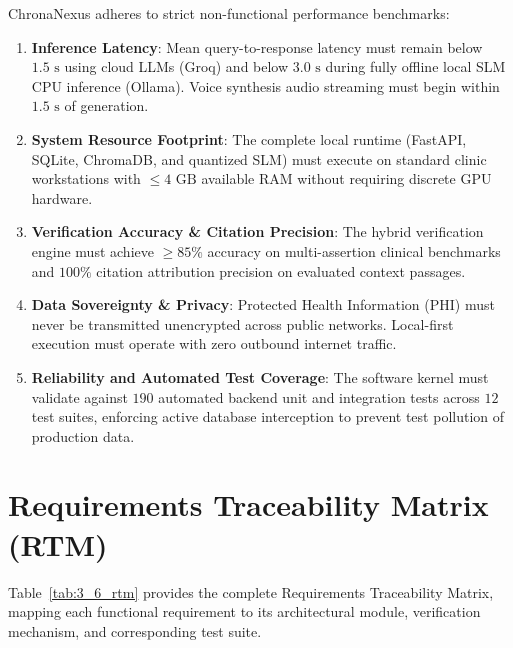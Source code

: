 ChronaNexus adheres to strict non-functional performance benchmarks:
\begin{enumerate}
    \item \textbf{Inference Latency}: Mean query-to-response latency must remain below $1.5\text{ s}$ using cloud LLMs (Groq) and below $3.0\text{ s}$ during fully offline local SLM CPU inference (Ollama). Voice synthesis audio streaming must begin within $1.5\text{ s}$ of generation.
    \item \textbf{System Resource Footprint}: The complete local runtime (FastAPI, SQLite, ChromaDB, and quantized SLM) must execute on standard clinic workstations with $\le 4\text{ GB}$ available RAM without requiring discrete GPU hardware.
    \item \textbf{Verification Accuracy \& Citation Precision}: The hybrid verification engine must achieve $\ge 85\%$ accuracy on multi-assertion clinical benchmarks and $100\%$ citation attribution precision on evaluated context passages.
    \item \textbf{Data Sovereignty \& Privacy}: Protected Health Information (PHI) must never be transmitted unencrypted across public networks. Local-first execution must operate with zero outbound internet traffic.
    \item \textbf{Reliability and Automated Test Coverage}: The software kernel must validate against $190$ automated backend unit and integration tests across $12$ test suites, enforcing active database interception to prevent test pollution of production data.
\end{enumerate}


\section{Requirements Traceability Matrix (RTM)}
\label{sec:sys_rtm}

Table~\ref{tab:3_6_rtm} provides the complete Requirements Traceability Matrix, mapping each functional requirement to its architectural module, verification mechanism, and corresponding test suite.

